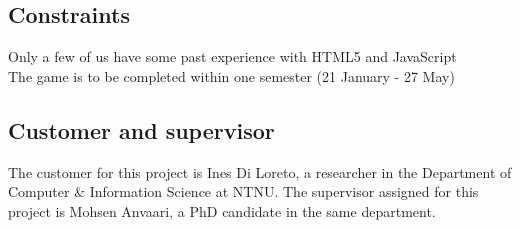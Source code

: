\subsection{Constraints}

Only a few of us have some past experience with HTML5 and JavaScript\\
The game is to be completed within one semester (21 January - 27 May)

\subsection{Customer and supervisor}
The customer for this project is Ines Di Loreto, a researcher in the Department 
of Computer \& Information Science at NTNU. The supervisor assigned for this 
project is Mohsen Anvaari, a PhD candidate in the same department.




